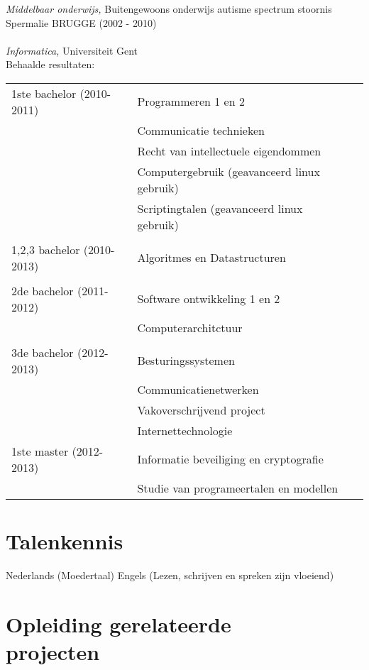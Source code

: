 \documentclass[margin, 10pt]{res} %
\begin{document}
\begin{resume}
{\sl Middelbaar onderwijs,} Buitengewoons onderwijs autisme spectrum stoornis \\
Spermalie BRUGGE (2002 - 2010)
\\ \\
{\sl Informatica,} Universiteit Gent \\
Behaalde resultaten:
\begin{tabular}{l l l}
1ste bachelor (2010-2011) & Programmeren 1 en 2 \\
						  & Communicatie technieken \\
						  & Recht van intellectuele eigendommen \\
						  & Computergebruik (geavanceerd linux gebruik) \\
						  & Scriptingtalen (geavanceerd linux gebruik) \\
\\					 
1,2,3 bachelor (2010-2013) &  Algoritmes en Datastructuren \\
\\
2de bachelor (2011-2012) & Software ontwikkeling 1 en 2 \\
		                 & Computerarchitctuur \\
\\	
3de bachelor (2012-2013) & Besturingssystemen \\
						 & Communicatienetwerken \\
						 & Vakoverschrijvend project \\
						 & Internettechnologie \\
1ste master (2012-2013)  & Informatie beveiliging en cryptografie \\
						 & Studie van programeertalen en modellen \\
\end{tabular}
\section{Talenkennis}
Nederlands (Moedertaal)
Engels (Lezen, schrijven en spreken zijn vloeiend)
\pagebreak

\section{Opleiding gerelateerde \\ projecten} 


\end{resume}
\end{document}
